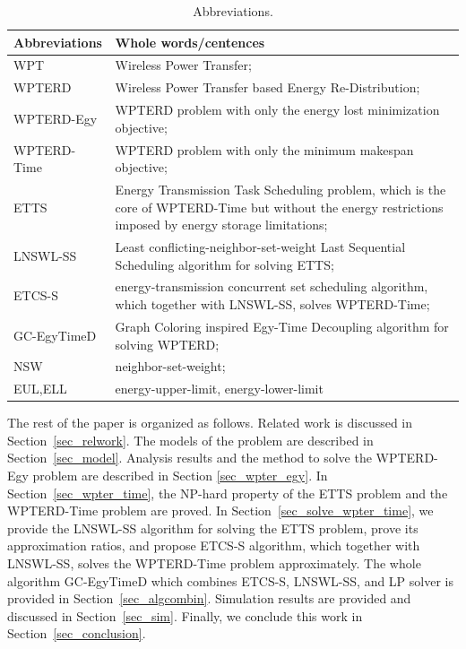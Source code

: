 \documentclass[journal,10pt]{IEEEtran}
\begin{document}
\begin{table}[!htbp]
\centering
\caption{Abbreviations.}
\label{T0}
\footnotesize{
\begin{tabular}
{|p{}|p{}|}
\hline
\hline
\textbf{Abbreviations} & Whole words/centences\\
\hline
\hline
WPT & Wireless Power Transfer;\\
\hline
WPTERD & Wireless Power Transfer based Energy Re-Distribution;\\
\hline
WPTERD-Egy & WPTERD problem with only the energy lost minimization objective;\\
\hline
WPTERD-Time & WPTERD problem with only the minimum makespan objective;\\
\hline
ETTS & Energy Transmission Task Scheduling problem, which is the core of WPTERD-Time but without the energy restrictions imposed by energy storage limitations;\\
\hline
LNSWL-SS & Least conflicting-neighbor-set-weight Last Sequential Scheduling algorithm for solving ETTS;\\
\hline
ETCS-S & energy-transmission concurrent set scheduling algorithm, which together with LNSWL-SS, solves WPTERD-Time;\\
\hline
GC-EgyTimeD & Graph Coloring inspired Egy-Time Decoupling algorithm  for solving WPTERD;\\
\hline
NSW & neighbor-set-weight;\\
\hline
EUL,ELL &energy-upper-limit, energy-lower-limit\\
\hline
\hline
\end{tabular}
}
\end{table}

The rest of the paper is organized as follows. Related work is discussed in Section~\ref{sec_relwork}. The models of the problem are described in Section~\ref{sec_model}. Analysis results and the method to solve the WPTERD-Egy problem are described in Section \ref{sec_wpter_egy}. In Section~\ref{sec_wpter_time}, the NP-hard property of the ETTS problem and the WPTERD-Time problem are proved. In Section~\ref{sec_solve_wpter_time}, we provide the LNSWL-SS algorithm for solving the ETTS problem, prove its approximation ratios, and propose ETCS-S algorithm, which together with LNSWL-SS, solves the WPTERD-Time problem approximately. The whole algorithm GC-EgyTimeD which combines ETCS-S, LNSWL-SS, and LP solver is provided in Section~\ref{sec_algcombin}. Simulation results are provided and discussed in Section~\ref{sec_sim}. Finally, we conclude this work in Section~\ref{sec_conclusion}.
\end{document}
